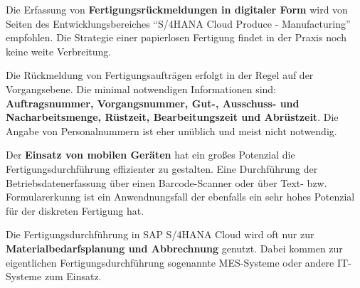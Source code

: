 \begin{definitionForm}[KA-T-2]
Die Erfassung von \textbf{Fertigungsrückmeldungen in digitaler Form} wird von Seiten des Entwicklungsbereiches \enquote{S/4HANA Cloud Produce - Manufacturing} empfohlen. Die Strategie einer papierlosen Fertigung findet in der Praxis noch keine weite Verbreitung.
\end{definitionForm}

\begin{definitionForm}[KA-T-3]
Die Rückmeldung von Fertigungsaufträgen erfolgt in der Regel auf der Vorgangsebene. Die minimal notwendigen Informationen sind: \textbf{Auftragsnummer, Vorgangsnummer, Gut-, Ausschuss- und Nacharbeitsmenge, Rüstzeit, Bearbeitungszeit und Abrüstzeit}. Die Angabe von Personalnummern ist eher unüblich und meist nicht notwendig.
\end{definitionForm}

\begin{definitionForm}[KA-T-4]
Der \textbf{Einsatz von mobilen Geräten} hat ein großes Potenzial die Fertigungsdurchführung effizienter zu gestalten. Eine Durchführung der Betriebsdatenerfassung über einen Barcode-Scanner oder über Text- bzw. Formularerkunng ist ein Anwendnungsfall der ebenfalls ein sehr hohes Potenzial für der diskreten Fertigung hat.
\end{definitionForm}

\begin{definitionForm}[KA-T-5]
Die Fertigungsdurchführung in SAP S/4HANA Cloud wird oft nur zur \textbf{Materialbedarfsplanung und Abbrechnung} genutzt. Dabei kommen zur eigentlichen Fertigungsdurchführung sogenannte MES-Systeme oder andere IT-Systeme zum Einsatz.
\end{definitionForm}

